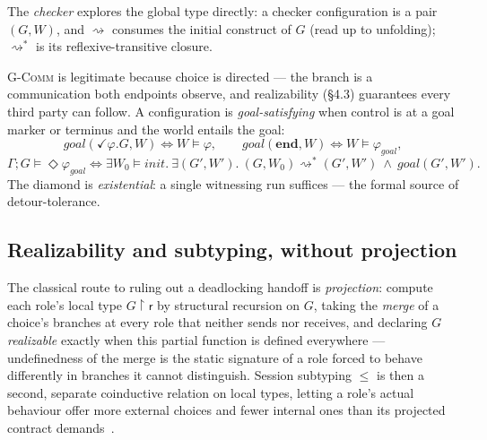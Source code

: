 \documentclass[11pt]{article}
\theoremstyle{plain}
\theoremstyle{definition}
\newcommand{\reach}{\rightsquigarrow}
\newcommand{\reachs}{\reach^{*}}
\newcommand{\goal}{\mathit{goal}}
\newcommand{\gphi}{\varphi_{\mathit{goal}}}
\newcommand{\restr}[1]{{\restriction}#1}
\newcommand{\achbox}{\vDash\Diamond}
\begin{document}
The \emph{checker} explores the global type directly: a checker configuration is
a pair $(G,W)$, and $\reach$ consumes the initial construct of $G$
(read up to unfolding); $\reachs$ is its reflexive-transitive closure.
\textsc{G-Comm} is legitimate because choice is directed --- the branch is a
communication both endpoints observe, and realizability (\S4.3) guarantees every
third party can follow. A configuration is \emph{goal-satisfying} when control
is at a goal marker or terminus and the world entails the goal:
\[
\goal(\checkmark\varphi.G,W)\iff W\vDash\varphi,\qquad
\goal(\mathbf{end},W)\iff W\vDash\gphi,
\]
\[
\Gamma;G\achbox\gphi\iff
\exists W_0\vDash\mathit{init}.\ \exists(G',W').\ (G,W_0)\reachs(G',W')\ \wedge\ \goal(G',W').
\]
The diamond is \emph{existential}: a single witnessing run suffices --- the
formal source of detour-tolerance.

\subsection{Realizability and subtyping, without projection}
\label{sec:no-projection}
The classical route to ruling out a deadlocking handoff is \emph{projection}: compute
each role's local type $G\restr{\mathsf r}$ by structural recursion on $G$, taking
the \emph{merge} of a choice's branches at every role that neither sends nor
receives, and declaring $G$ \emph{realizable} exactly when this partial function is
defined everywhere --- undefinedness of the merge is the static signature of a
role forced to behave differently in branches it cannot distinguish. Session
subtyping $\le$ is then a second, separate coinductive relation on local types,
letting a role's actual behaviour offer more external choices and fewer internal
ones than its projected contract demands~\cite{gayhole,ghilezan,scalasyoshida}.
\end{document}
